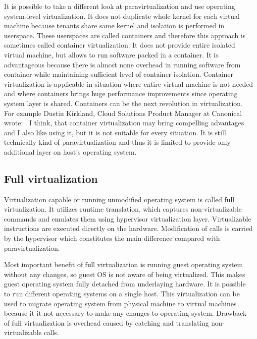 It is possible to take a different look at paravirtualization and 
use operating system-level virtualization. It does not duplicate whole kernel for each virtual machine because tenants share same kernel and isolation is performed in userspace. These userspaces are called containers and therefore this approach is sometimes called container virtualization. It does not provide entire isolated virtual machine, but allows to run software packed in a container. It is advantageous because there is almost none overhead in running software from container while maintaining sufficient level of container isolation. Container virtualization is applicable in situation where entire virtual machine is not needed and where containers brings huge performance improvements since operating system layer is shared. Containers can be the next revolution in virtualization. For example Dustin Kirkland, Cloud Solutions Product Manager at Canonical wrote:  \cite{ubuntu-docker}. I think, that container virtualization may bring compelling advantages and I also like using it, but it is not suitable for every situation. It is still technically kind of paravirtualization and thus it is limited to provide only additional layer on host's operating system.

\subsection{Full virtualization}
Virtualization capable or running unmodified operating system is called full virtualization. It utilizes runtime translation, which captures non-virtualizable commands and emulates them using hypervisor virtualization layer. Virtualizable instructions are executed directly on the hardware. Modification of  calls is carried by the hypervisor which constitutes the main difference compared with paravirtualization. 

Most important benefit of full virtualization is running guest operating system without any changes, so guest \Ac{OS} is not aware of being virtualized. This makes guest operating system fully detached from underlaying hardware. It is possible to run different operating systems on a single host. This virtualization can be used to migrate operating system from physical machine to virtual machines because it it not necessary to make any changes to operating system. Drawback of full virtualization is overhead caused by catching and translating non-virtualizable calls. 

